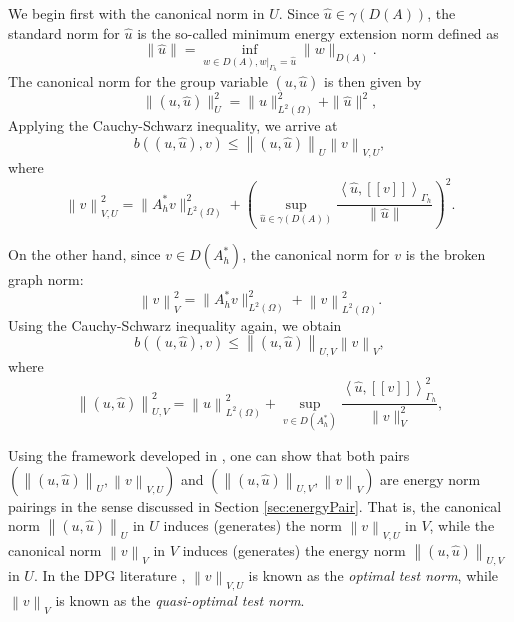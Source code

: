 \documentclass[11pt,onecolumn]{scrartcl}
\newcommand{\eqnlab}[1]{\label{eq:#1}}
\newcommand{\secref}[1]{\ref{sec:#1}}
\newcommand{\nor}[1]{\left\| #1 \right\|}
\newcommand{\LRp}[1]{\left( #1 \right)}
\newcommand{\LRs}[1]{\left[ #1 \right]}
\newcommand{\LRa}[1]{\left\langle #1 \right\rangle}
\newcommand{\jump}[1] {\ensuremath{\LRs{\![#1]\!}}}
\newcommand{\uh}{\widehat{u}}
\renewcommand{\L}{L^2\LRp{\Omega}}
\newcommand{\Gh}{\Gamma_h}
\begin{document}
We begin first with the canonical norm in $U$. Since $\uh \in \gamma\LRp{D\LRp{A}}$, the standard norm for $\uh$ is
the so-called minimum energy extension norm defined as
\begin{equation}
\eqnlab{MEnorm}
\|\widehat{u}\| = \inf_{w\in D\LRp{A},
  \left.w\right|_{\Gh}=\widehat{u}} \|w\|_{D\LRp{A}}.
\end{equation}
The canonical norm for the group variable $\LRp{u,\uh}$ is then given by
\[
\|\left(u,\widehat{u}\right)\|_U^2 = \|u\|^2_{\L} + \|\widehat{u}\|^2,
\]
Applying the Cauchy-Schwarz inequality, we arrive at
\[
b\LRp{\LRp{u,\uh},v} \le \nor{\LRp{u,\uh}}_U \nor{v}_{V,U},
\]
where
\[
\nor{v}_{V,U}^2 = \|A_h^*v\|_{\L}^2
+\left(\sup_{\widehat{u} \in \gamma\LRp{D\LRp{A}}} \frac{\LRa{ \widehat{u},
  \jump{v} }_{\Gh}}{\|\widehat{u}\|}\right)^2.
\]

On the other hand, since $v \in D\LRp{A^*_h}$, the canonical norm for
$v$ is the broken graph norm: 
\[
\nor{v}_V^2 =  \|A_h^*v\|_{\L}^2 + \nor{v}_{\L}^2.
\]
Using the Cauchy-Schwarz inequality again, we obtain
\[
b\LRp{\LRp{u,\uh},v} \le \nor{\LRp{u,\uh}}_{U,V} \nor{v}_{V},
\]
where
\begin{equation}
\eqnlab{inducedQuasi}
\nor{\LRp{u,\uh}}_{U,V}^2 = \nor{u}_{\L}^2
+\sup_{v \in D\LRp{A_h^*}} \frac{\LRa{\widehat{u},
  \jump{v}}_{\Gh}^2}{\|v\|_V^2},
\end{equation}

Using the framework developed in \cite{Bui-ThanhDemkowiczGhattas11a},
one can show that both pairs $\LRp{\nor{\LRp{u,\uh}}_U,
  \nor{v}_{V,U}}$ and $\LRp{\nor{\LRp{u,\uh}}_{U,V}, \nor{v}_{V}}$ are
energy norm pairings in the sense discussed in Section
\secref{energyPair}. That is, the canonical norm $\nor{\LRp{u,\uh}}_U$
in $U$ induces (generates) the norm $\nor{v}_{V,U}$ in $V$, while the
canonical norm $\nor{v}_V$ in $V$ induces (generates) the energy norm
$\nor{\LRp{u,\uh}}_{U,V}$ in $U$. In the DPG literature \cite{DPG4}, $\nor{v}_{V,U}$ is known as the {\em optimal test norm},
while $\nor{v}_{V}$ is known as the {\em quasi-optimal test norm}.
\end{document}
